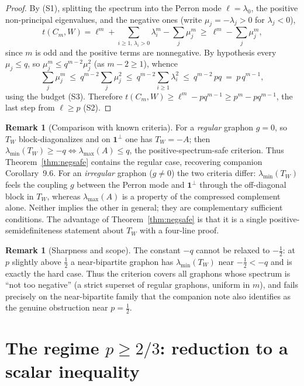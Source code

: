 \documentclass[11pt]{article}
\theoremstyle{definition}
\newtheorem{remark}[theorem]{Remark}
\newcommand{\1}{\mathbf{1}}
\begin{document}
\begin{proof}
By (S1), splitting the spectrum into the Perron mode $\ell=\lambda_0$, the
positive non-principal eigenvalues, and the negative ones (write
$\mu_j=-\lambda_j>0$ for $\lambda_j<0$),
\[
t(C_m,W)=\ell^m+\!\!\sum_{i\ge1,\,\lambda_i>0}\!\!\lambda_i^m-\sum_j\mu_j^m
\ \ge\ \ell^m-\sum_j\mu_j^m,
\]
since $m$ is odd and the positive terms are nonnegative. By hypothesis every
$\mu_j\le q$, so $\mu_j^m\le q^{m-2}\mu_j^2$ (as $m-2\ge1$), whence
\[
\sum_j\mu_j^m\ \le\ q^{m-2}\sum_j\mu_j^2\ \le\ q^{m-2}\sum_{i\ge1}\lambda_i^2
\ \le\ q^{m-2}\,pq\ =\ p\,q^{m-1},
\]
using the budget (S3). Therefore $t(C_m,W)\ge\ell^m-pq^{m-1}\ge p^m-pq^{m-1}$,
the last step from $\ell\ge p$ (S2).
\end{proof}

\begin{remark}[Comparison with known criteria]\label{rem:compare}
For a \emph{regular} graphon $g=0$, so $T_W$ block-diagonalizes and on $\1^\perp$
one has $T_W=-A$; then $\lambda_{\min}(T_W)\ge-q\iff\lambda_{\max}(A)\le q$, the
positive-spectrum-safe criterion. Thus Theorem~\ref{thm:negsafe} contains the
regular case, recovering companion Corollary~9.6. For an \emph{irregular}
graphon ($g\ne0$) the two criteria differ: $\lambda_{\min}(T_W)$ feels the
coupling $g$ between the Perron mode and $\1^\perp$ through the off-diagonal
block in $T_W$, whereas $\lambda_{\max}(A)$ is a property of the compressed
complement alone. Neither implies the other in general; they are complementary
sufficient conditions. The advantage of Theorem~\ref{thm:negsafe} is that it is
a single positive-semidefiniteness statement about $T_W$ with a four-line proof.
\end{remark}

\begin{remark}[Sharpness and scope]\label{rem:scope}
The constant $-q$ cannot be relaxed to $-\tfrac12$: at $p$ slightly above
$\tfrac12$ a near-bipartite graphon has $\lambda_{\min}(T_W)$ near $-\tfrac12<-q$
and is exactly the hard case. Thus the criterion covers all graphons whose
spectrum is ``not too negative'' (a strict superset of regular graphons,
uniform in $m$), and fails precisely on the near-bipartite family that the
companion note also identifies as the genuine obstruction near $p=\tfrac12$.
\end{remark}

\section{The regime \texorpdfstring{$p\ge 2/3$}{p>=2/3}: reduction to a scalar
inequality}\label{sec:reduction}
\end{document}
